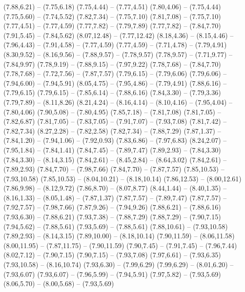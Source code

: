 {  (7.88,6.21) -- (7.75,6.18)
  (7.75,4.44) -- (7.77,4.51)
  (7.80,4.06) -- (7.75,4.44)
  (7.75,5.60) -- (7.74,5.52)
  (7.82,7.34) -- (7.75,7.10)
  (7.81,7.08) -- (7.75,7.10)
  (7.77,4.51) -- (7.77,4.59)
  (7.77,7.82) -- (7.79,7.89)
  (7.77,7.82) -- (7.84,7.70)
  (7.91,5.45) -- (7.84,5.62)
  (8.07,12.48) -- (7.77,12.42)
  (8.18,4.36) -- (8.15,4.46) -- (7.96,4.43) -- (7.91,4.58) -- (7.77,4.59)
  (7.77,4.59) -- (7.71,4.78) -- (7.79,4.91)
  (8.30,9.52) -- (8.16,9.56) -- (7.88,9.57) -- (7.78,9.57)
  (7.78,9.57) -- (7.71,9.77) -- (7.84,9.97)
  (7.78,9.19) -- (7.88,9.15) -- (7.97,9.22)
  (7.78,7.68) -- (7.84,7.70)
  (7.78,7.68) -- (7.72,7.56) -- (7.87,7.57)
  (7.79,6.15) -- (7.79,6.06)
  (7.79,6.06) -- (7.94,6.00) -- (7.94,5.91)
  (8.05,4.75) -- (7.95,4.86) -- (7.79,4.91)
  (7.88,6.16) -- (7.79,6.15)
  (7.79,6.15) -- (7.85,6.14) -- (7.88,6.16)
  (7.84,3.30) -- (7.79,3.36)
  (7.79,7.89) -- (8.11,8.26)
  (8.21,4.24) -- (8.16,4.14) -- (8.10,4.16) -- (7.95,4.04) -- (7.80,4.06)
  (7.90,5.08) -- (7.80,4.95)
  (7.85,7.18) -- (7.81,7.08)
  (7.81,7.05) -- (7.82,6.87)
  (7.81,7.05) -- (7.83,7.05) -- (7.91,7.07) -- (7.93,7.08)
  (7.81,7.42) -- (7.82,7.34)
  (8.27,2.28) -- (7.82,2.58)
  (7.82,7.34) -- (7.88,7.29)
  (7.87,1.37) -- (7.84,1.20) -- (7.94,1.06) -- (7.92,0.93)
  (7.83,6.86) -- (7.97,6.83)
  (8.24,2.07) -- (7.95,1.84) -- (7.84,1.41)
  (7.84,7.45) -- (7.89,7.47)
  (7.89,2.93) -- (7.84,3.30)
  (7.84,3.30) -- (8.14,3.15)
  (7.84,2.61) -- (8.45,2.84) -- (8.64,3.02)
  (7.84,2.61) -- (7.89,2.93)
  (7.84,7.70) -- (7.98,7.66)
  (7.84,7.70) -- (7.87,7.57)
  (7.85,10.53) -- (7.93,10.58)
  (7.85,10.53) -- (8.04,10.21) -- (8.18,10.14)
  (7.86,12.53) -- (8.00,12.61)
  (7.86,9.98) -- (8.12,9.72)
  (7.86,8.70) -- (8.07,8.77)
  (8.44,1.44) -- (8.40,1.35) -- (8.16,1.33) -- (8.05,1.48) -- (7.87,1.37)
  (7.87,7.57) -- (7.89,7.47)
  (7.87,7.57) -- (7.92,7.57) -- (7.98,7.66)
  (7.87,9.26) -- (7.94,9.26)
  (7.88,6.21) -- (7.88,6.16)
  (7.93,6.30) -- (7.88,6.21)
  (7.93,7.38) -- (7.88,7.29)
  (7.88,7.29) -- (7.90,7.15)
  (7.94,5.62) -- (7.88,5.61)
  (7.93,5.69) -- (7.88,5.61)
  (7.88,10.61) -- (7.93,10.58)
  (7.89,2.93) -- (8.14,3.15)
  (7.89,10.00) -- (8.18,10.14)
  (7.90,11.59) -- (8.06,11.58)
  (8.00,11.95) -- (7.87,11.75) -- (7.90,11.59)
  (7.90,7.45) -- (7.91,7.45) -- (7.96,7.44)
  (8.02,7.12) -- (7.90,7.15)
  (7.90,7.15) -- (7.93,7.08)
  (7.97,6.61) -- (7.93,6.35)
  (7.93,10.58) -- (8.16,10.74)
  (7.93,6.30) -- (7.99,6.29)
  (7.99,6.29) -- (8.01,6.20) -- (7.93,6.07)
  (7.93,6.07) -- (7.96,5.99) -- (7.94,5.91)
  (7.97,5.82) -- (7.93,5.69)
  (8.06,5.70) -- (8.00,5.68) -- (7.93,5.69)
}

